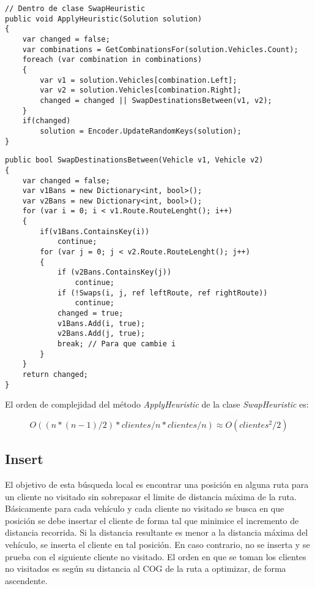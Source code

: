 \bigskip

\begin{minipage}{\textwidth}
\begin{lstlisting}
// Dentro de clase SwapHeuristic
public void ApplyHeuristic(Solution solution)
{
	var changed = false;
	var combinations = GetCombinationsFor(solution.Vehicles.Count);
	foreach (var combination in combinations)
	{
		var v1 = solution.Vehicles[combination.Left];
		var v2 = solution.Vehicles[combination.Right];
		changed = changed || SwapDestinationsBetween(v1, v2);
	}
	if(changed)
		solution = Encoder.UpdateRandomKeys(solution);
}
\end{lstlisting}
\end{minipage}

\begin{minipage}{\textwidth}
\begin{lstlisting}
public bool SwapDestinationsBetween(Vehicle v1, Vehicle v2)
{
	var changed = false;
	var v1Bans = new Dictionary<int, bool>();
	var v2Bans = new Dictionary<int, bool>();
	for (var i = 0; i < v1.Route.RouteLenght(); i++)
	{
		if(v1Bans.ContainsKey(i)) 
			continue;
		for (var j = 0; j < v2.Route.RouteLenght(); j++)
		{
			if (v2Bans.ContainsKey(j)) 
				continue;
			if (!Swaps(i, j, ref leftRoute, ref rightRoute)) 
				continue;
			changed = true;
			v1Bans.Add(i, true);
			v2Bans.Add(j, true);
			break; // Para que cambie i
		}
	}
	return changed;
}
\end{lstlisting}
\end{minipage}

\bigskip

El orden de complejidad del método \textit{ApplyHeuristic} de la clase \textit{SwapHeuristic} es:

\begin{equation*}
O((n * (n-1) / 2 ) * clientes/n * clientes/n) \approx O(clientes^2/2)
\end{equation*}

\subsection{Insert}

El objetivo de esta búsqueda local es encontrar una posición en alguna ruta para un cliente no visitado sin sobrepasar el limite de distancia máxima de la ruta. Básicamente para cada vehículo y cada cliente no visitado se busca en que posición se debe insertar el cliente de forma tal que minimice el incremento de distancia recorrida. Si la distancia resultante es menor a la distancia máxima del vehículo, se inserta el cliente en tal posición. En caso contrario, no se inserta y se prueba con el siguiente cliente no visitado. El orden en que se toman los clientes no visitados es según su distancia al COG de la ruta a optimizar, de forma ascendente.

